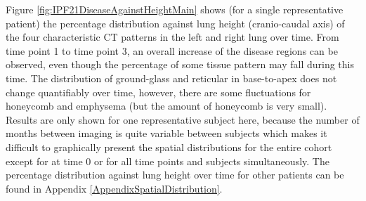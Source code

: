 Figure \ref{fig:IPF21DiseaseAgainstHeightMain} shows (for a single representative patient) the percentage distribution against lung height (cranio-caudal axis) of the four characteristic CT patterns in the left and right lung over time. From time point 1 to time point 3, an overall increase of the disease regions can be observed, even though the percentage of some tissue pattern may fall during this time. The distribution of ground-glass and reticular in base-to-apex does not change quantifiably over time, however, there are some fluctuations for honeycomb and emphysema (but the amount of honeycomb is very small). Results are only shown for one representative subject here, because the number of months between imaging is quite variable between subjects which makes it difficult to graphically present the spatial distributions for the entire cohort except for at time 0 or for all time points and subjects simultaneously. The percentage distribution against lung height over time for other patients can be found in Appendix \ref{AppendixSpatialDistribution}.
\newpage

